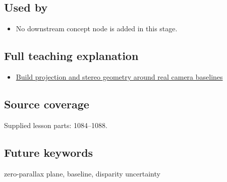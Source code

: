 \subsection{Used by}\label{used-by}

\begin{itemize}
\tightlist
\item
  No downstream concept node is added in this stage.
\end{itemize}

\subsection{Full teaching explanation}\label{full-teaching-explanation}

\begin{itemize}
\tightlist
\item
  \href{Continuous\%20Notes/Computing\%20Foundations\%20-\%20From\%20Bits\%20to\%20C++\%20and\%20Systems\%20APIs\#Build\%20projection\%20and\%20stereo\%20geometry\%20around\%20real\%20camera\%20baselines}{Build projection and stereo geometry around real camera baselines}
\end{itemize}

\subsection{Source coverage}\label{source-coverage}

Supplied lesson parts: 1084--1088.

\subsection{Future keywords}\label{future-keywords}

zero-parallax plane, baseline, disparity uncertainty
